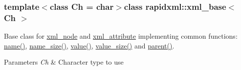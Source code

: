 \subsubsection*{template$<$class Ch = char$>$class rapidxml\+::xml\+\_\+base$<$ Ch $>$}

Base class for \hyperlink{singletonrapidxml_1_1xml__node}{xml\+\_\+node} and \hyperlink{singletonrapidxml_1_1xml__attribute}{xml\+\_\+attribute} implementing common functions\+: \hyperlink{classrapidxml_1_1xml__base_a9a09739310469995db078ebd0da3ed45}{name()}, \hyperlink{classrapidxml_1_1xml__base_a7e7f98b3d01e1eab8dc1ca69aad9af84}{name\+\_\+size()}, \hyperlink{classrapidxml_1_1xml__base_adcdaccff61c665f039d9344e447b7445}{value()}, \hyperlink{classrapidxml_1_1xml__base_a9fcf201ed0915ac18dd43b0b5dcfaf32}{value\+\_\+size()} and \hyperlink{classrapidxml_1_1xml__base_a7f31ae930f93852830234db1ae59c4c4}{parent()}. 
\begin{DoxyParams}{Parameters}
{\em Ch} & Character type to use \\
\hline
\end{DoxyParams}


